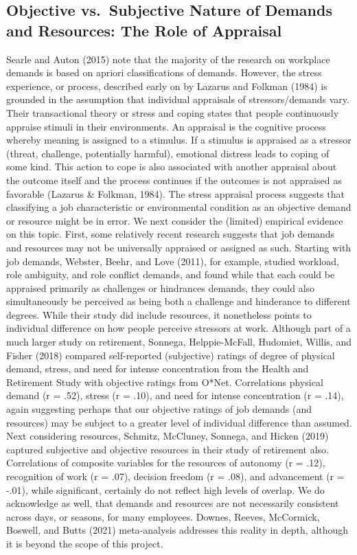 \documentclass[
  english,
  man]{apa6}
\begin{document}
\hypertarget{objective-vs.-subjective-nature-of-demands-and-resources-the-role-of-appraisal}{%
\subsection{Objective vs.~Subjective Nature of Demands and Resources: The Role of Appraisal}\label{objective-vs.-subjective-nature-of-demands-and-resources-the-role-of-appraisal}}

Searle and Auton (2015) note that the majority of the research on workplace demands is based on apriori classifications of demands. However, the stress experience, or process, described early on by Lazarus and Folkman (1984) is grounded in the assumption that individual appraisals of stressors/demands vary. Their transactional theory or stress and coping states that people continuously appraise stimuli in their environments. An appraisal is the cognitive process whereby meaning is assigned to a stimulus. If a stimulus is appraised as a stressor (threat, challenge, potentially harmful), emotional distress leads to coping of some kind. This action to cope is also associated with another appraisal about the outcome itself and the process continues if the outcomes is not appraised as favorable (Lazarus \& Folkman, 1984). The stress appraisal process suggests that classifying a job characteristic or environmental condition as an objective demand or resource might be in error.
We next consider the (limited) empirical evidence on this topic. First, some relatively recent research suggests that job demands and resources may not be universally appraised or assigned as such. Starting with job demands, Webster, Beehr, and Love (2011), for example, studied workload, role ambiguity, and role conflict demands, and found while that each could be appraised primarily as challenges or hindrances demands, they could also simultaneously be perceived as being both a challenge and hinderance to different degrees. While their study did include resources, it nonetheless points to individual difference on how people perceive stressors at work. Although part of a much larger study on retirement, Sonnega, Helppie-McFall, Hudomiet, Willis, and Fisher (2018) compared self-reported (subjective) ratings of degree of physical demand, stress, and need for intense concentration from the Health and Retirement Study with objective ratings from O*Net. Correlations physical demand (r = .52), stress (r = .10), and need for intense concentration (r = .14), again suggesting perhaps that our objective ratings of job demands (and resources) may be subject to a greater level of individual difference than assumed. Next considering resources, Schmitz, McCluney, Sonnega, and Hicken (2019) captured subjective and objective resources in their study of retirement also. Correlations of composite variables for the resources of autonomy (r = .12), recognition of work (r = .07), decision freedom (r = .08), and advancement (r = -.01), while significant, certainly do not reflect high levels of overlap.
We do acknowledge as well, that demands and resources are not necessarily consistent across days, or seasons, for many employees. Downes, Reeves, McCormick, Boswell, and Butts (2021) meta-analysis addresses this reality in depth, although it is beyond the scope of this project.
\end{document}
